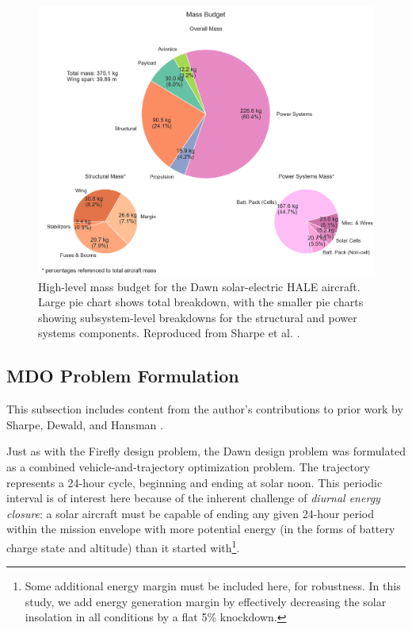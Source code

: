\begin{figure}[h]
    \centering
    \includegraphics[width=\textwidth]{../figures/dawnfigures/Mass_breakdown_baseline.png}
    \caption{High-level mass budget for the Dawn solar-electric HALE aircraft. Large pie chart shows total breakdown, with the smaller pie charts showing subsystem-level breakdowns for the structural and power systems components. Reproduced from Sharpe et al. \cite{sharpe_optimization_2021}.}
    \label{fig:dawn_mass_budget}
\end{figure}

\subsection{MDO Problem Formulation}
\label{sec:dawn-mdo}

\begin{attrib}
    This subsection includes content from the author's contributions to prior work by Sharpe, Dewald, and Hansman \cite{sharpe_optimization_2021}.
\end{attrib}

Just as with the Firefly design problem, the Dawn design problem was formulated as a combined vehicle-and-trajectory optimization problem. The trajectory represents a 24-hour cycle, beginning and ending at solar noon. This periodic interval is of interest here because of the inherent challenge of \emph{diurnal energy closure}: a solar aircraft must be capable of ending any given 24-hour period within the mission envelope with more potential energy (in the forms of battery charge state and altitude) than it started with\footnote{Some additional energy margin must be included here, for robustness. In this study, we add energy generation margin by effectively decreasing the solar insolation in all conditions by a flat 5\% knockdown.}.

